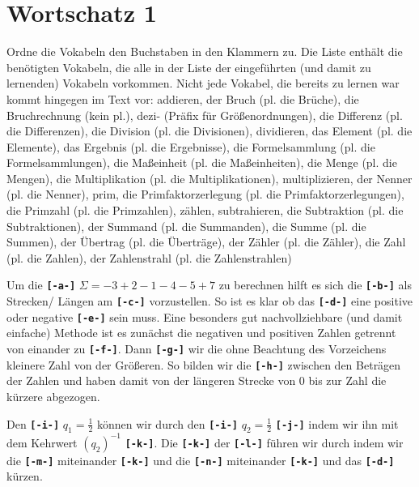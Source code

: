 \documentclass[a4paper]{book}%
\theoremstyle{definition}
\begin{document}
\section{Wortschatz 1}

Ordne die Vokabeln den Buchstaben in den Klammern zu. Die Liste enthält die benötigten Vokabeln, die alle in der Liste der eingeführten (und damit zu lernenden) Vokabeln vorkommen. Nicht jede Vokabel, die bereits zu lernen war kommt hingegen im Text vor:
addieren,
der Bruch (pl. die Brüche),
die Bruchrechnung (kein pl.),
dezi- (Präfix für Größenordnungen),
die Differenz (pl. die Differenzen),
die Division (pl. die Divisionen),
dividieren,
das Element (pl. die Elemente),
das Ergebnis (pl. die Ergebnisse),
die Formelsammlung (pl. die Formelsammlungen),
die Maßeinheit (pl. die Maßeinheiten),
die Menge (pl. die Mengen),
die Multiplikation (pl. die Multiplikationen),
multiplizieren,
der Nenner (pl. die Nenner),
prim,
die Primfaktorzerlegung (pl. die Primfaktorzerlegungen),
die Primzahl (pl. die Primzahlen),
zählen,
subtrahieren,
die Subtraktion (pl. die Subtraktionen),
der Summand (pl. die Summanden),
die Summe (pl. die Summen),
der Übertrag (pl. die Überträge),
der Zähler (pl. die Zähler),
die Zahl (pl. die Zahlen),
der Zahlenstrahl (pl. die Zahlenstrahlen)

\vspace{1em}

Um die \textbf{\texttt{[-a-]}} $\Sigma = -3 +2 -1 -4 -5 +7$ zu berechnen hilft es sich die \textbf{\texttt{[-b-]}} als Strecken/ Längen am \textbf{\texttt{[-c-]}} vorzustellen. So ist es klar ob das \textbf{\texttt{[-d-]}} eine positive oder negative \textbf{\texttt{[-e-]}} sein muss. Eine besonders gut nachvollziehbare (und damit einfache) Methode ist es zunächst die negativen und positiven Zahlen getrennt von einander zu \textbf{\texttt{[-f-]}}. Dann \textbf{\texttt{[-g-]}} wir die ohne Beachtung des Vorzeichens kleinere Zahl von der Größeren. So bilden wir die \textbf{\texttt{[-h-]}} zwischen den Beträgen der Zahlen und haben damit von der längeren Strecke von 0 bis zur Zahl die kürzere abgezogen.

Den \textbf{\texttt{[-i-]}} $q_1 = \frac{1}{2}$ können wir durch den \textbf{\texttt{[-i-]}} $q_2 = \frac{1}{2}$ \textbf{\texttt{[-j-]}} indem wir ihn mit dem Kehrwert ${(q_2)}^{-1}$ \textbf{\texttt{[-k-]}}. Die \textbf{\texttt{[-k-]}} der \textbf{\texttt{[-l-]}} führen wir durch indem wir die \textbf{\texttt{[-m-]}} miteinander \textbf{\texttt{[-k-]}} und die \textbf{\texttt{[-n-]}} miteinander \textbf{\texttt{[-k-]}} und das \textbf{\texttt{[-d-]}} kürzen.
\end{document}
